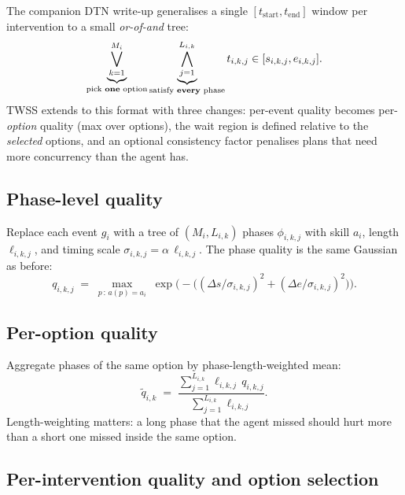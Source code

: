 \documentclass[11pt]{article}
\begin{document}
The companion DTN write-up generalises a single
$[t_{\text{start}}, t_{\text{end}}]$ window per intervention to a
small \emph{or-of-and} tree:
\begin{equation}
  \underbrace{\bigvee_{k=1}^{M_i}}_{\text{pick \textbf{one} option}}
  \underbrace{\bigwedge_{j=1}^{L_{i,k}}}_{\text{satisfy \textbf{every} phase}}
  t_{i,k,j} \in [s_{i,k,j}, e_{i,k,j}].
\end{equation}
TWSS extends to this format with three changes: per-event quality
becomes per-\emph{option} quality (max over options), the wait region
is defined relative to the \emph{selected} options, and an optional
consistency factor penalises plans that need more concurrency than
the agent has.

\subsection{Phase-level quality}
\label{sec:disj-phase}

Replace each event $g_i$ with a tree of $(M_i, L_{i,k})$ phases
$\phi_{i,k,j}$ with skill $a_i$, length $\ell_{i,k,j}$, and timing
scale $\sigma_{i,k,j} = \alpha\,\ell_{i,k,j}$. The phase quality is
the same Gaussian as before:
\begin{equation}
  q_{i,k,j} \;=\; \max_{p \,:\, a(p) = a_i}\;
                  \exp\!\bigl(-\bigl((\Delta s/\sigma_{i,k,j})^2
                                  + (\Delta e/\sigma_{i,k,j})^2\bigr)\bigr).
\end{equation}

\subsection{Per-option quality}
\label{sec:disj-option}

Aggregate phases of the same option by phase-length-weighted mean:
\begin{equation}
  \tilde q_{i,k} \;=\;
    \frac{\sum_{j=1}^{L_{i,k}} \ell_{i,k,j}\,q_{i,k,j}}
         {\sum_{j=1}^{L_{i,k}} \ell_{i,k,j}}.
  \label{eq:option-q}
\end{equation}
Length-weighting matters: a long phase that the agent missed should
hurt more than a short one missed inside the same option.

\subsection{Per-intervention quality and option selection}
\label{sec:disj-intervention}
\end{document}
